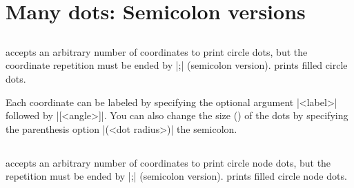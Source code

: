 \section{Many dots: Semicolon versions}
\label{si:manydots}

\subsection{\protect\cmd{\tzcdots(*)}}
\label{ssi:tzcdots}

\icmd{\tzcdots} accepts an arbitrary number of coordinates to print circle dots, but the coordinate repetition must be ended by |;| (semicolon version).
\icmd{\tzcdots*} prints filled circle dots.

\begin{tzcode}{.3}
\end{tzcode}

Each coordinate can be labeled by specifying the optional argument |{<label>}| followed by |[<angle>]|. You can also change the size () of the dots by specifying the  parenthesis option |(<dot radius>)|  the semicolon.

\begin{tzcode}{.3}
\end{tzcode}



\subsection{\protect\cmd{\tzdots(*)}}
\label{ssi:tzdots}

\icmd{\tzdots} accepts an arbitrary number of coordinates to print circle node dots, but the repetition must be ended by |;| (semicolon version).
\icmd{\tzdots*} prints filled circle node dots.

\begin{tzcode}{.3}
\end{tzcode}

